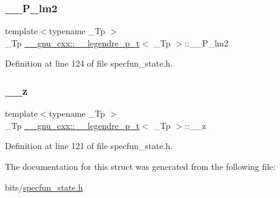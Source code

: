 \subsubsection{\texorpdfstring{\+\_\+\+\_\+\+P\+\_\+lm2}{\_\_P\_lm2}}
{\footnotesize\ttfamily template$<$typename \+\_\+\+Tp $>$ \\
\+\_\+\+Tp \hyperlink{struct____gnu__cxx_1_1____legendre__p__t}{\+\_\+\+\_\+gnu\+\_\+cxx\+::\+\_\+\+\_\+legendre\+\_\+p\+\_\+t}$<$ \+\_\+\+Tp $>$\+::\+\_\+\+\_\+\+P\+\_\+lm2}



Definition at line 124 of file specfun\+\_\+state.\+h.

\mbox{\label{struct____gnu__cxx_1_1____legendre__p__t_ad1ee2ca27099d0f3c75220247a0779f6}} 
\subsubsection{\texorpdfstring{\+\_\+\+\_\+z}{\_\_z}}
{\footnotesize\ttfamily template$<$typename \+\_\+\+Tp $>$ \\
\+\_\+\+Tp \hyperlink{struct____gnu__cxx_1_1____legendre__p__t}{\+\_\+\+\_\+gnu\+\_\+cxx\+::\+\_\+\+\_\+legendre\+\_\+p\+\_\+t}$<$ \+\_\+\+Tp $>$\+::\+\_\+\+\_\+z}



Definition at line 121 of file specfun\+\_\+state.\+h.



The documentation for this struct was generated from the following file\+:\begin{DoxyCompactItemize}
\item 
bits/\hyperlink{specfun__state_8h}{specfun\+\_\+state.\+h}\end{DoxyCompactItemize}
